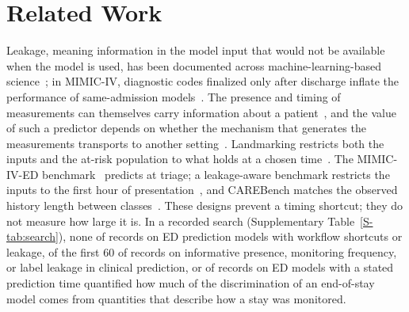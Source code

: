 \section{Related Work}
\label{sec:related-work}

Leakage, meaning information in the model input that would not be available when the model is used, has been documented across machine-learning-based
science~\cite{kapoor2023leakage}; in MIMIC-IV, diagnostic codes finalized only after discharge inflate the performance of same-admission
models~\cite{ramadan2025icdleakage}. The presence and timing of measurements can themselves carry information about a patient~\cite{sisk2021informativepresence}, and the value of such a predictor depends on whether the mechanism that generates the measurements transports to another setting~\cite{groenwold2020informativemissingness}. Landmarking restricts both the inputs and the at-risk population to what holds at a chosen
time~\cite{vanhouwelingen2007landmarking}. The
MIMIC-IV-ED benchmark~\cite{xie2022mimic4ed} predicts at triage; a leakage-aware benchmark restricts the inputs to the first hour of presentation~\cite{solaiman2026earlydeterioration}, and CAREBench matches the observed history length between classes~\cite{keoliya2025carebench}. These designs prevent a timing shortcut; they do not measure how large it is. In a recorded search (Supplementary Table~\ref{S-tab:search}), none of \RVLitHitsOne{} records on ED prediction models with workflow
shortcuts or leakage, of the first 60 of \RVLitHitsSix{} records on informative presence, monitoring frequency, or label leakage in clinical prediction, or of \RVLitHitsSeven{} records on ED models with a stated prediction time quantified how much of the discrimination of an end-of-stay model comes from quantities that describe how a stay was monitored.

